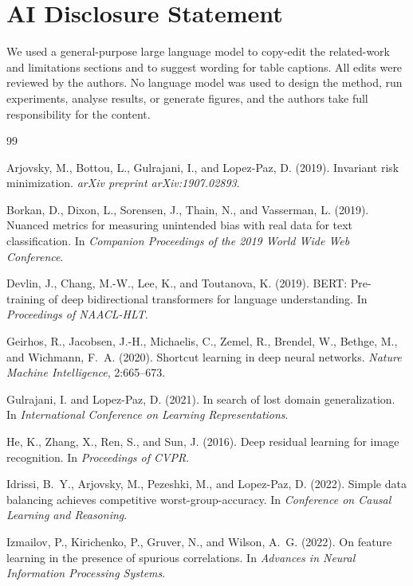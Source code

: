 \documentclass{article}
\begin{document}
\section*{AI Disclosure Statement}

We used a general-purpose large language model to copy-edit the related-work and limitations sections and to suggest wording for table captions. All edits were reviewed by the authors. No language model was used to design the method, run experiments, analyse results, or generate figures, and the authors take full responsibility for the content.

\begin{thebibliography}{99}

Arjovsky, M., Bottou, L., Gulrajani, I., and Lopez-Paz, D. (2019).
Invariant risk minimization.
\textit{arXiv preprint arXiv:1907.02893}.

Borkan, D., Dixon, L., Sorensen, J., Thain, N., and Vasserman, L. (2019).
Nuanced metrics for measuring unintended bias with real data for text classification.
In \textit{Companion Proceedings of the 2019 World Wide Web Conference}.

Devlin, J., Chang, M.-W., Lee, K., and Toutanova, K. (2019).
BERT: Pre-training of deep bidirectional transformers for language understanding.
In \textit{Proceedings of NAACL-HLT}.

Geirhos, R., Jacobsen, J.-H., Michaelis, C., Zemel, R., Brendel, W., Bethge, M., and Wichmann, F.~A. (2020).
Shortcut learning in deep neural networks.
\textit{Nature Machine Intelligence}, 2:665--673.

Gulrajani, I. and Lopez-Paz, D. (2021).
In search of lost domain generalization.
In \textit{International Conference on Learning Representations}.

He, K., Zhang, X., Ren, S., and Sun, J. (2016).
Deep residual learning for image recognition.
In \textit{Proceedings of CVPR}.

Idrissi, B.~Y., Arjovsky, M., Pezeshki, M., and Lopez-Paz, D. (2022).
Simple data balancing achieves competitive worst-group-accuracy.
In \textit{Conference on Causal Learning and Reasoning}.

Izmailov, P., Kirichenko, P., Gruver, N., and Wilson, A.~G. (2022).
On feature learning in the presence of spurious correlations.
In \textit{Advances in Neural Information Processing Systems}.


\end{thebibliography}
\end{document}
